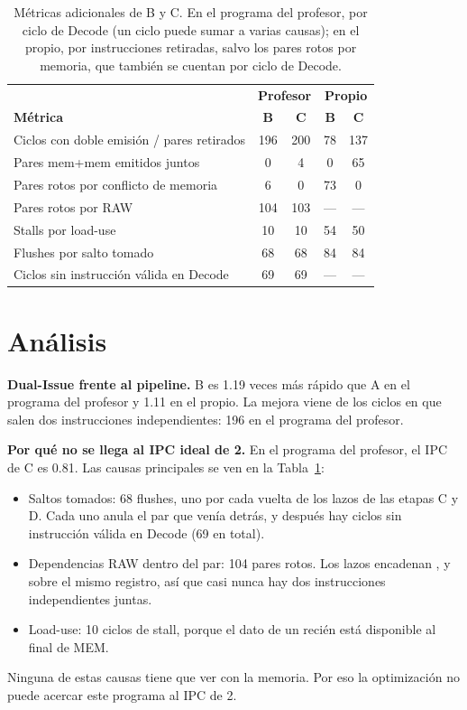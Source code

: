\documentclass[11pt,a4paper]{article}
\newcommand{\sig}[1]{\texttt{\detokenize{#1}}}
\begin{document}
\begin{table}[htbp]
\centering
\caption{Métricas adicionales de B y C. En el programa del profesor, por ciclo de Decode (un ciclo puede sumar a varias causas); en el propio, por instrucciones retiradas, salvo los pares rotos por memoria, que también se cuentan por ciclo de Decode.}
\label{tab:ef-metricas}
\begin{tabular}{l c c c c}
\toprule
& \multicolumn{2}{c}{\textbf{Profesor}} & \multicolumn{2}{c}{\textbf{Propio}} \\
\textbf{Métrica} & \textbf{B} & \textbf{C} & \textbf{B} & \textbf{C} \\
\midrule
Ciclos con doble emisión / pares retirados & 196 & 200 & 78 & 137 \\
Pares mem+mem emitidos juntos & 0 & 4 & 0 & 65 \\
Pares rotos por conflicto de memoria & 6 & 0 & 73 & 0 \\
Pares rotos por RAW & 104 & 103 & --- & --- \\
Stalls por load-use & 10 & 10 & 54 & 50 \\
Flushes por salto tomado & 68 & 68 & 84 & 84 \\
Ciclos sin instrucción válida en Decode & 69 & 69 & --- & --- \\
\bottomrule
\end{tabular}
\end{table}

\section{Análisis}

\textbf{Dual-Issue frente al pipeline.} B es 1.19 veces más rápido que A en el programa del profesor y 1.11 en el propio. La mejora viene de los ciclos en que salen dos instrucciones independientes: 196 en el programa del profesor.

\textbf{Por qué no se llega al IPC ideal de 2.} En el programa del profesor, el IPC de C es 0.81. Las causas principales se ven en la Tabla~\ref{tab:ef-metricas}:
\begin{itemize}
  \item Saltos tomados: 68 flushes, uno por cada vuelta de los lazos de las etapas C y D. Cada uno anula el par que venía detrás, y después hay ciclos sin instrucción válida en Decode (69 en total).
  \item Dependencias RAW dentro del par: 104 pares rotos. Los lazos encadenan \sig{addi}, \sig{slt} y \sig{beq} sobre el mismo registro, así que casi nunca hay dos instrucciones independientes juntas.
  \item Load-use: 10 ciclos de stall, porque el dato de un \sig{lw} recién está disponible al final de MEM.
\end{itemize}
Ninguna de estas causas tiene que ver con la memoria. Por eso la optimización no puede acercar este programa al IPC de 2.
\end{document}
